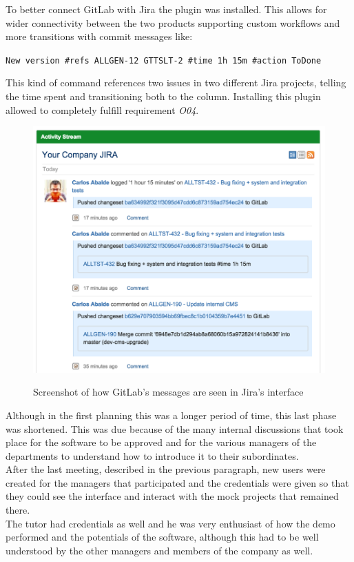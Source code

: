 	To better connect GitLab with Jira the plugin \cite{gitlab-listener} was installed.
	This allows for wider connectivity between the two products supporting custom workflows and more transitions with commit messages like:
	\begin{center}
		\texttt{New version \#refs ALLGEN-12 GTTSLT-2 \#time 1h 15m \#action ToDone}
	\end{center}
	This kind of command references two issues in two different Jira projects, telling the time spent and transitioning both to the  column.
	Installing this plugin allowed to completely fulfill requirement \textit{O04}.
	\begin{figure}[H]
		\centering
		\includegraphics[width=.7\textwidth]{resources/aiaiai}\\
		\caption{Screenshot of how GitLab's messages are seen in Jira's interface\cite{gitlab-listener}}
	\end{figure}
	Although in the first planning this was a longer period of time, this last phase was shortened.
	This was due because of the many internal discussions that took place for the software to be approved and for the various managers of the departments to understand how to introduce it to their subordinates.\\
	After the last meeting, described in the previous paragraph, new users were created for the managers that participated and the credentials were given so that they could see the interface and interact with the mock projects that remained there.\\
	The tutor had credentials as well and he was very enthusiast of how the demo performed and the potentials of the software, although this had to be well understood by the other managers and members of the company as well.\\
